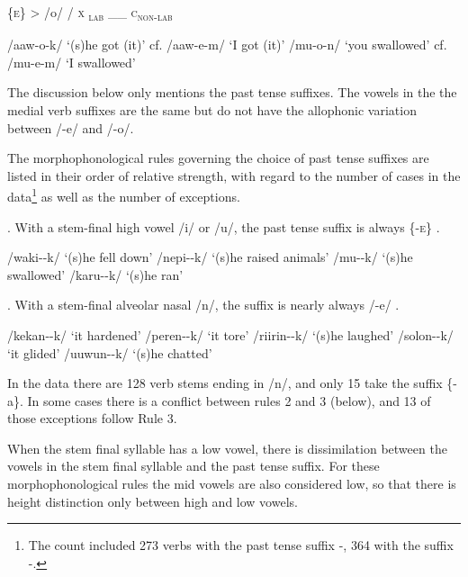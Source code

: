\ea
\label{ex:2:pasttenseruleEo}
\{\textsc{e}\} {{\textgreater}} /o/  /  \textsc{x} \textsubscript{\textsc{lab}}  \_\_  \textsc{c}\textsubscript{\textsc{non-lab}} 
\z

\ea
\label{ex:2:Eoex}
\ea
/aaw-o-k/  `(s)he got (it)'  cf.  /aaw-e-m/  `I got (it)'
\ex
/mu-o-n/  `you swallowed'  cf.  /mu-e-m/  `I swallowed'
\z
\z

The discussion below only mentions the past tense suffixes. The vowels in the  the medial verb suffixes are the same but do not have the allophonic variation between /-e/ and /-o/.  

The morphophonological rules governing the choice of past tense suffixes are listed in their order of relative strength, with regard to the number of cases in the data\footnote{The count included 273 verbs with the past tense suffix {\nobreakdash-},  364 with the suffix -.} as well as the number of exceptions.

\ea
{}.  With a stem-final high vowel /i/ or /u/, the past tense suffix is always \{\nobreakdash-\textsc{e}\} .
\z


\ea
\label{ex:2:rule1ex}
\ea
/waki--k/  `(s)he fell down'
\ex
/nepi--k/  `(s)he raised animals'
\ex
/mu--k/  `(s)he swallowed'
\ex
/karu--k/  `(s)he ran'
\z
\z

\ea
{}.  With a stem-final alveolar nasal /n/, the suffix is nearly always /-e/ .
\z

\ea
\label{ex:2:rule2ex}
\ea
/kekan--k/  `it hardened'
\ex
/peren--k/  `it tore'
\ex
/riirin--k/  `(s)he laughed'
\ex
/solon--k/  `it glided'
\ex
/uuwun--k/  `(s)he chatted'
\z
\z

In the data there are 128 verb stems ending in /n/, and only 15 take the suffix \{\nobreakdash-a\}. In some cases there is a conflict between rules 2 and 3 (below), and 13 of those exceptions follow Rule 3.

\ea
{} When the stem final syllable has a low vowel, there is dissimilation between the vowels in the stem final syllable and the past tense suffix. For these morphophonological rules the mid vowels are also considered low, so that there is height distinction only between high and low vowels.
\z

